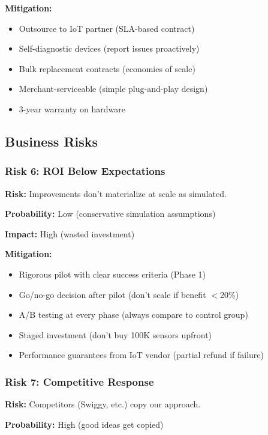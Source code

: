 \documentclass[11pt,a4paper]{article}
\begin{document}
\textbf{Mitigation:}
\begin{itemize}[leftmargin=*]
    \item Outsource to IoT partner (SLA-based contract)
    \item Self-diagnostic devices (report issues proactively)
    \item Bulk replacement contracts (economies of scale)
    \item Merchant-serviceable (simple plug-and-play design)
    \item 3-year warranty on hardware
\end{itemize}

\subsection{Business Risks}

\subsubsection{Risk 6: ROI Below Expectations}

\textbf{Risk:} Improvements don't materialize at scale as simulated.

\textbf{Probability:} Low (conservative simulation assumptions)

\textbf{Impact:} High (wasted investment)

\textbf{Mitigation:}
\begin{itemize}[leftmargin=*]
    \item Rigorous pilot with clear success criteria (Phase 1)
    \item Go/no-go decision after pilot (don't scale if benefit $<$20\%)
    \item A/B testing at every phase (always compare to control group)
    \item Staged investment (don't buy 100K sensors upfront)
    \item Performance guarantees from IoT vendor (partial refund if failure)
\end{itemize}

\subsubsection{Risk 7: Competitive Response}

\textbf{Risk:} Competitors (Swiggy, etc.) copy our approach.

\textbf{Probability:} High (good ideas get copied)
\end{document}
